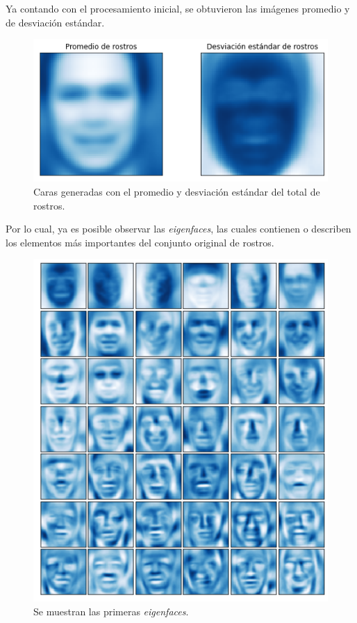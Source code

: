 \documentclass[conference]{IEEEtran}
\begin{document}
Ya contando con el procesamiento inicial, se obtuvieron las imágenes promedio y de desviación estándar.

\begin{figure}[H]
    \centering
    \includegraphics[scale=0.25]{imgs/mean_sd_faces.png}
    \caption{Caras generadas con el promedio y desviación estándar del total de rostros.}
    \label{fig:svd_pc}
\end{figure}

Por lo cual, ya es posible observar las \textit{eigenfaces}, las cuales contienen o describen los elementos más importantes del conjunto original de rostros.

\begin{figure}[H]
    \centering
    \includegraphics[scale=0.25]{imgs/eigenfaces.png}
    \caption{Se muestran las primeras \textit{eigenfaces}.}
    \label{fig:svd_pc}
\end{figure}
\end{document}
